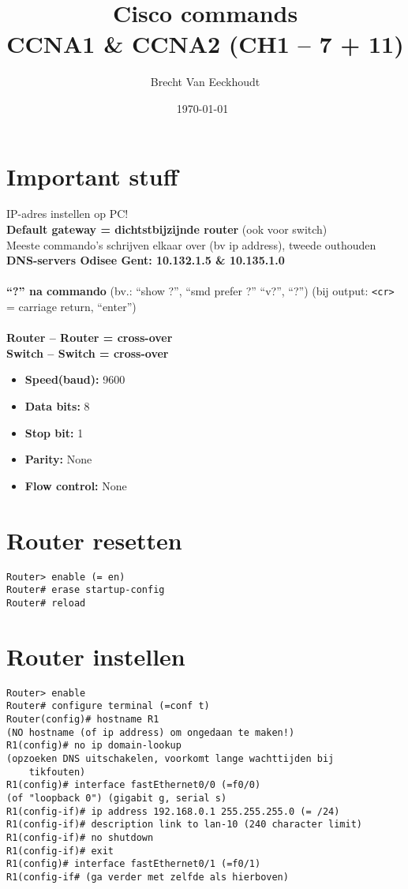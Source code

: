 \documentclass[10pt, a4paper]{article}
\title{Cisco commands \\CCNA1 \& CCNA2 (CH1 -- 7 + 11)}
\author{Brecht Van Eeckhoudt}
\date{\today \ \currenttime}
\begin{document}
\maketitle

\section{Important stuff}
IP-adres instellen op PC!\\
\textbf{Default gateway = dichtstbijzijnde router }(ook voor switch)\\
Meeste commando's schrijven elkaar over (bv ip address), tweede outhouden\\
\textbf{DNS-servers Odisee Gent: 10.132.1.5 \& 10.135.1.0}\\ \\
\textbf{``?'' na commando} (bv.: ``show ?'', ``smd prefer ?'' ``v?'', ``?'') (bij output: \texttt{<cr>} = carriage return, ``enter'')\\ \\
\textbf{Router -- Router = cross-over}\\
\textbf{Switch -- Switch = cross-over}\\
\begin{itemize}[noitemsep,nolistsep]
\item \textbf{Speed(baud):} 9600
\item \textbf{Data bits:} 8
\item \textbf{Stop bit:} 1
\item \textbf{Parity:} None
\item \textbf{Flow control:} None\\
\end{itemize}

\section{Router resetten}
\begin{lstlisting}
Router> enable (= en)
Router# erase startup-config
Router# reload
\end{lstlisting}

\section{Router instellen}
\begin{lstlisting}
Router> enable
Router# configure terminal (=conf t)
Router(config)# hostname R1
(NO hostname (of ip address) om ongedaan te maken!)
R1(config)# no ip domain-lookup
(opzoeken DNS uitschakelen, voorkomt lange wachttijden bij
	tikfouten)
R1(config)# interface fastEthernet0/0 (=f0/0)
(of "loopback 0") (gigabit g, serial s)
R1(config-if)# ip address 192.168.0.1 255.255.255.0 (= /24)
R1(config-if)# description link to lan-10 (240 character limit)
R1(config-if)# no shutdown
R1(config-if)# exit
R1(config)# interface fastEthernet0/1 (=f0/1)
R1(config-if# (ga verder met zelfde als hierboven)
\end{lstlisting}
\end{document}
